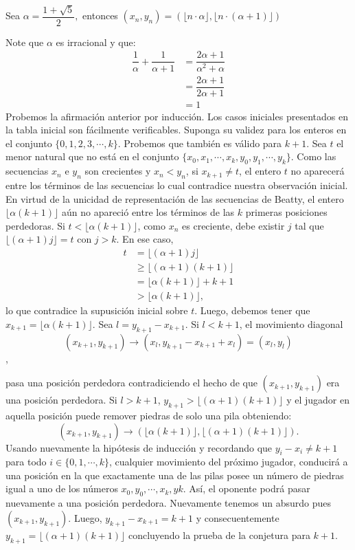 \begin{cnj}
	Sea $\alpha = \dfrac{1 + \sqrt{5}}{2},$ entonces $(x_{n}, y_{n}) = (\lfloor n \cdot \alpha \rfloor, \lfloor n \cdot (\alpha + 1)\rfloor)$
	
	Note que $\alpha$ es irracional y que:
	\begin{align*}
		\dfrac{1}{\alpha} + \dfrac{1}{\alpha + 1} &= \dfrac{2\alpha + 1}{\alpha^{2} + \alpha}\\
		&= \dfrac{2\alpha + 1}{2\alpha + 1}\\
		&= 1
	\end{align*}
	Probemos la afirmaci\'on anterior por inducci\'on. Los casos iniciales presentados en la tabla inicial son f\'acilmente verificables. Suponga su validez para los enteros en el conjunto $\{0,1,2,3,\cdots,k\}$. Probemos que tambi\'en es v\'alido para $k + 1$. Sea $t$ el menor natural que no est\'a en el conjunto $\{x_{0},x_{1},\cdots,x_{k},y_{0},y_{1},\cdots,y_{k}\}$. Como las secuencias  $x_{n}$ e $y_{n}$ son crecientes y $x_{n} < y_{n}$, si $x_{k + 1} \ne t$, el entero $t$ no aparecer\'a entre los t\'erminos de las secuencias lo cual contradice nuestra observaci\'on inicial. En virtud de la unicidad de representaci\'on de las secuencias de Beatty, el entero $\lfloor \alpha(k + 1)\rfloor$ a\'un no apareci\'o entre los t\'erminos de las $k$ primeras posiciones perdedoras. Si $t < \lfloor \alpha(k + 1) \rfloor$, como $x_{n}$ es creciente, debe existir $j$ tal que $\lfloor(\alpha + 1)j \rfloor = t$ con $j > k$. En ese caso,
	\begin{align*}
		t &= \lfloor(\alpha + 1)j \rfloor\\
		&\geq \lfloor(\alpha +1)(k + 1)\rfloor\\
		&= \lfloor \alpha(k + 1)\rfloor + k + 1\\
		&> \lfloor \alpha(k + 1) \rfloor,
	\end{align*}  
	lo que contradice la supusici\'on inicial sobre $t$. Luego, debemos tener que $x_{k + 1} = \lfloor\alpha(k + 1)\rfloor.$ Sea $l = y_{k + 1} - x_{k + 1}$. Si 
	$l < k + 1$, el movimiento diagonal 
	$$(x_{k + 1},y_{k + 1}) \rightarrow (x_{l},y_{k + 1} - x_{k + 1} + x_{l}) = (x_{l}, y_{l})$$,
	\end{cnj} 
	pasa una posici\'on perdedora contradiciendo el hecho de que $(x_{k + 1},y_{k + 1})$ era una posici\'on perdedora. Si $l > k + 1$, $y_{k + 1} > \lfloor(\alpha + 1)(k + 1) \rfloor$ y el jugador en aquella posici\'on puede remover piedras de solo una pila obteniendo:
	$$(x_{k + 1},y_{k + 1}) \rightarrow (\lfloor \alpha(k + 1)\rfloor,\lfloor(\alpha + 1)(k + 1)\rfloor).$$
	 Usando nuevamente la hip\'otesis de inducci\'on y recordando que $y_{i} - x_{i} \ne k + 1$ para todo $i \in \{0,1,\cdots,k\}$, cualquier movimiento del pr\'oximo jugador, conducir\'a a una posici\'on en la que exactamente una de las pilas posee un n\'umero de piedras igual a uno de los n\'umeros $x_{0}, y_{0},\cdots,x_{k},y{k}$. As\'i, el oponente podr\'a pasar nuevamente a una posici\'on perdedora. Nuevamente tenemos un absurdo pues $(x_{k + 1},y_{k + 1}).$ Luego, $y_{k + 1} - x_{k + 1} = k + 1$ y consecuentemente $y_{k + 1} = \lfloor(\alpha + 1)(k + 1)\rfloor$ concluyendo la prueba de la conjetura para $k + 1.$